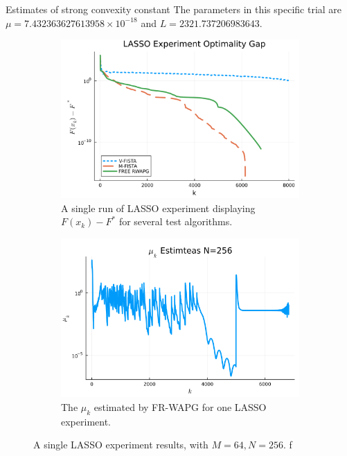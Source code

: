 \documentclass[11pt]{beamer}
\theoremstyle{definition}
\begin{document}
        \begin{frame}{Estimates of strong convexity constant}
            The parameters in this specific trial are $\mu = 7.432363627613958\times 10^{-18}$ and $L = 2321.737206983643$. 
            \begin{figure}[H]
                \begin{subfigure}[b]{0.47\textwidth}
                    \includegraphics[width=\textwidth]{assets/lasso_loss_256.png}
                    \caption
                    {A single run of LASSO experiment displaying $F(x_k) - F^*$ for several test algorithms.
                    }
                \end{subfigure}
                \begin{subfigure}[b]{0.47\textwidth}
                    \includegraphics[width=\textwidth]{assets/lasso_sc_estimates_256.png}
                    \caption{The $\mu_k$ estimated by FR-WAPG for one LASSO experiment. }
                \end{subfigure}
                \caption{A single LASSO experiment results, with $M = 64, N=256$. f}
                \label{fig:single-lass-mu-estimates}
            \end{figure}
        \end{frame}
\end{document}
